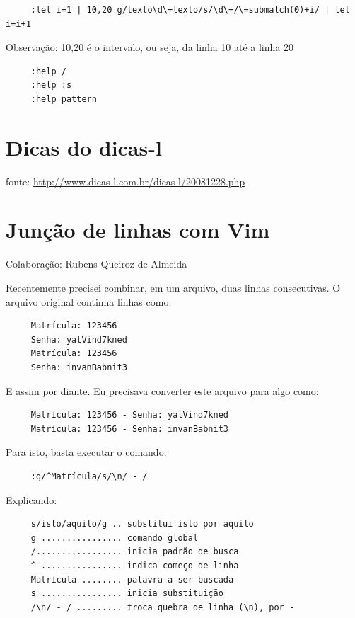 \documentclass[10pt,a4paper,openany]{book}
\begin{document}
\begin{verbatim}
     :let i=1 | 10,20 g/texto\d\+texto/s/\d\+/\=submatch(0)+i/ | let i=i+1
\end{verbatim}

Observação: 10,20 é o intervalo, ou seja, da linha 10 até a linha 20

\begin{verbatim}
     :help /
     :help :s
     :help pattern
\end{verbatim}

\section{Dicas do dicas-l}

fonte: \url{http://www.dicas-l.com.br/dicas-l/20081228.php}

\section{Junção de linhas com Vim}
\label{Junção de linhas com Vim}
Colaboração: Rubens Queiroz de Almeida

Recentemente precisei combinar, em um arquivo, duas linhas
consecutivas. O arquivo original continha linhas como:

\begin{verbatim}
     Matrícula: 123456
     Senha: yatVind7kned
     Matrícula: 123456
     Senha: invanBabnit3
\end{verbatim}

E assim por diante. Eu precisava converter este arquivo para algo como:

\begin{verbatim}
     Matrícula: 123456 - Senha: yatVind7kned
     Matrícula: 123456 - Senha: invanBabnit3
\end{verbatim}

Para isto, basta executar o comando:

\begin{verbatim}
     :g/^Matrícula/s/\n/ - /
\end{verbatim}

Explicando:

\begin{verbatim}
     s/isto/aquilo/g .. substitui isto por aquilo
     g ................ comando global
     /................. inicia padrão de busca
     ^ ................ indica começo de linha
     Matrícula ........ palavra a ser buscada
     s ................ inicia substituição
     /\n/ - / ......... troca quebra de linha (\n), por -
\end{verbatim}
\end{document}
